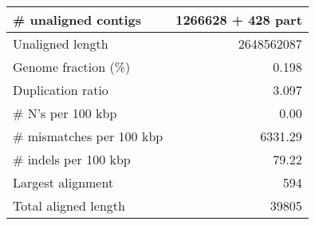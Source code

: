 \documentclass[12pt,a4paper]{article}
\begin{document}
\begin{table}[ht]
\begin{center}
\begin{tabular}{|l*{1}{|r}|}
\# unaligned contigs & 1266628 + 428 part \\ \hline
Unaligned length & 2648562087 \\ \hline
Genome fraction (\%) & 0.198 \\ \hline
Duplication ratio & 3.097 \\ \hline
\# N's per 100 kbp & 0.00 \\ \hline
\# mismatches per 100 kbp & 6331.29 \\ \hline
\# indels per 100 kbp & 79.22 \\ \hline
Largest alignment & 594 \\ \hline
Total aligned length & 39805 \\ \hline
\end{tabular}
\end{center}
\end{table}
\end{document}
